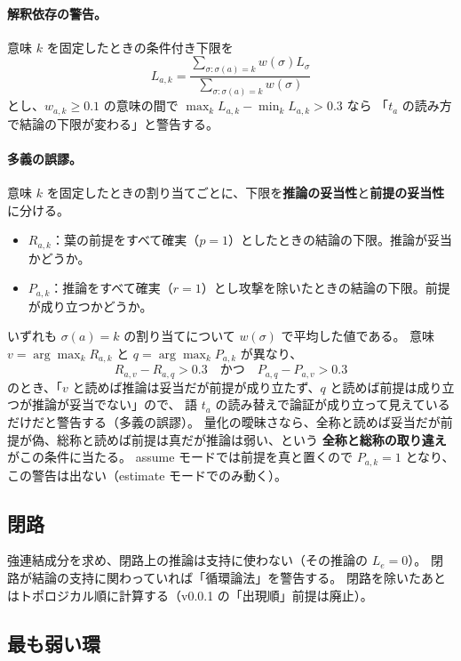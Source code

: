 \documentclass[a4paper,11pt]{ltjsarticle}
\begin{document}
\paragraph{解釈依存の警告。}
意味 $k$ を固定したときの条件付き下限を
\begin{equation}
  L_{a,k}=\frac{\sum_{\sigma:\sigma(a)=k} w(\sigma)L_\sigma}{\sum_{\sigma:\sigma(a)=k} w(\sigma)}
\end{equation}
とし、$w_{a,k}\ge 0.1$ の意味の間で $\max_k L_{a,k}-\min_k L_{a,k} > 0.3$ なら
「$t_a$ の読み方で結論の下限が変わる」と警告する。

\paragraph{多義の誤謬。}
意味 $k$ を固定したときの割り当てごとに、下限を\textbf{推論の妥当性}と\textbf{前提の妥当性}に分ける。
\begin{itemize}
  \item $R_{a,k}$：葉の前提をすべて確実（$p=1$）としたときの結論の下限。推論が妥当かどうか。
  \item $P_{a,k}$：推論をすべて確実（$r=1$）とし攻撃を除いたときの結論の下限。前提が成り立つかどうか。
\end{itemize}
いずれも $\sigma(a)=k$ の割り当てについて $w(\sigma)$ で平均した値である。
意味 $v=\arg\max_k R_{a,k}$ と $q=\arg\max_k P_{a,k}$ が異なり、
\begin{equation}
  R_{a,v}-R_{a,q} > 0.3 \quad\text{かつ}\quad P_{a,q}-P_{a,v} > 0.3
\end{equation}
のとき、「$v$ と読めば推論は妥当だが前提が成り立たず、$q$ と読めば前提は成り立つが推論が妥当でない」ので、
語 $t_a$ の読み替えで論証が成り立って見えているだけだと警告する（多義の誤謬）。
量化の曖昧さなら、全称と読めば妥当だが前提が偽、総称と読めば前提は真だが推論は弱い、という
\textbf{全称と総称の取り違え}がこの条件に当たる。
assume モードでは前提を真と置くので $P_{a,k}=1$ となり、この警告は出ない（estimate モードでのみ動く）。

\subsection{閉路}

強連結成分を求め、閉路上の推論は支持に使わない（その推論の $L_e=0$）。
閉路が結論の支持に関わっていれば「循環論法」を警告する。
閉路を除いたあとはトポロジカル順に計算する（v0.0.1 の「出現順」前提は廃止）。

\subsection{最も弱い環}
\end{document}

